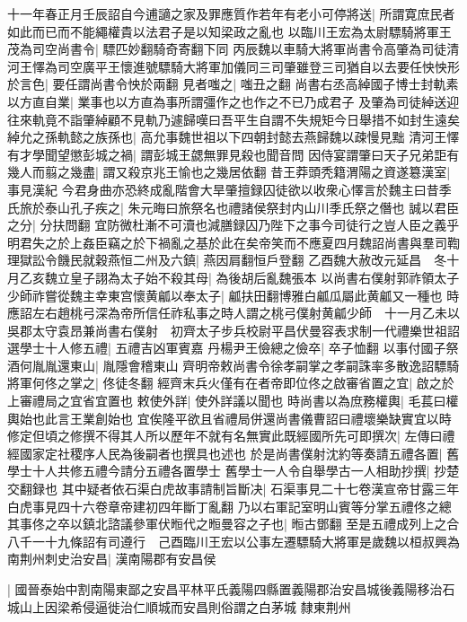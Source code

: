 十一年春正月壬辰詔自今逋讁之家及罪應質作若年有老小可停將送|{
	所謂寛庶民者如此而已而不能繩權貴以法君子是以知梁政之亂也}
以臨川王宏為太尉驃騎將軍王茂為司空尚書令|{
	驃匹妙翻騎奇寄翻下同}
丙辰魏以車騎大將軍尚書令高肇為司徒清河王懌為司空廣平王懷進號驃騎大將軍加儀同三司肇雖登三司猶自以去要任怏怏形於言色|{
	要任謂尚書令怏於兩翻}
見者嗤之|{
	嗤丑之翻}
尚書右丞高綽國子博士封軌素以方直自業|{
	業事也以方直為事所謂彊作之也作之不已乃成君子}
及肇為司徒綽送迎往來軌竟不詣肇綽顧不見軌乃遽歸嘆曰吾平生自謂不失規矩今日舉措不如封生遠矣綽允之孫軌懿之族孫也|{
	高允事魏世祖以下四朝封懿去燕歸魏以疎慢見黜}
清河王懌有才學聞望懲彭城之禍|{
	謂彭城王勰無罪見殺也聞音問}
因侍宴謂肇曰天子兄弟詎有幾人而翦之幾盡|{
	謂又殺京兆王愉也之幾居依翻}
昔王莽頭秃籍渭陽之資遂簒漢室|{
	事見漢紀}
今君身曲亦恐終成亂階會大旱肇擅録囚徒欲以收衆心懌言於魏主曰昔季氏旅於泰山孔子疾之|{
	朱元晦曰旅祭名也禮諸侯祭封内山川季氏祭之僭也}
誠以君臣之分|{
	分扶問翻}
宜防微杜漸不可瀆也減膳録囚乃陛下之事今司徒行之豈人臣之義乎明君失之於上姦臣竊之於下禍亂之基於此在矣帝笑而不應夏四月魏詔尚書與羣司鞫理獄訟令饑民就穀燕恒二州及六鎮|{
	燕因肩翻恒戶登翻}
乙酉魏大赦改元延昌　冬十月乙亥魏立皇子詡為太子始不殺其母|{
	為後胡后亂魏張本}
以尚書右僕射郭祚領太子少師祚嘗從魏主幸東宫懷黄㼐以奉太子|{
	㼐扶田翻博雅白㼐瓜屬此黄㼐又一種也}
時應詔左右趙桃弓深為帝所信任祚私事之時人謂之桃弓僕射黄㼐少師　十一月乙未以吳郡太守袁昂兼尚書右僕射　初齊太子步兵校尉平昌伏曼容表求制一代禮樂世祖詔選學士十人修五禮|{
	五禮吉凶軍賓嘉}
丹楊尹王儉總之儉卒|{
	卒子恤翻}
以事付國子祭酒何胤胤還東山|{
	胤隱會稽東山}
齊明帝敕尚書令徐孝嗣掌之孝嗣誅率多散逸詔驃騎將軍何佟之掌之|{
	佟徒冬翻}
經齊末兵火僅有在者帝即位佟之啟審省置之宜|{
	啟之於上審禮局之宜省宜置也}
敕使外詳|{
	使外詳議以聞也}
時尚書以為庶務權輿|{
	毛萇曰權輿始也此言王業創始也}
宜俟隆平欲且省禮局併還尚書儀曹詔曰禮壞樂缺實宜以時修定但頃之修撰不得其人所以歷年不就有名無實此既經國所先可即撰次|{
	左傳曰禮經國家定社稷序人民為後嗣者也撰具也述也}
於是尚書僕射沈約等奏請五禮各置|{
	舊學士十人共修五禮今請分五禮各置學士}
舊學士一人令自舉學古一人相助抄撰|{
	抄楚交翻録也}
其中疑者依石渠白虎故事請制旨斷决|{
	石渠事見二十七卷漢宣帝甘露三年白虎事見四十六卷章帝建初四年斷丁亂翻}
乃以右軍記室明山賓等分掌五禮佟之總其事佟之卒以鎮北諮議參軍伏暅代之暅曼容之子也|{
	暅古鄧翻}
至是五禮成列上之合八千一十九條詔有司遵行　己酉臨川王宏以公事左遷驃騎大將軍是歲魏以桓叔興為南荆州刺史治安昌|{
	漢南陽郡有安昌侯}


|{
	國晉泰始中割南陽東鄙之安昌平林平氏義陽四縣置義陽郡治安昌城後義陽移治石城山上因梁希侵逼徙治仁順城而安昌則俗謂之白茅城}
隸東荆州

